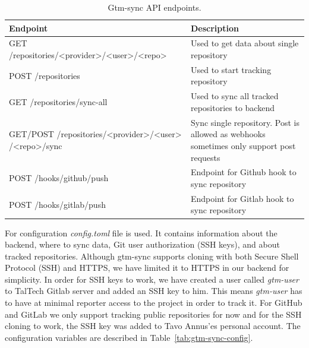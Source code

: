 \begin{table}[H]
    \centering
    \begin{tabular}{ | p{8cm} | p{6cm} |}
        \hline
        \textbf{Endpoint} & \textbf{Description}\\
        \hline
        GET /repositories/<provider>/<user>/<repo> & Used to get data about single repository \\
        \hline
        POST /repositories & Used to start tracking repository\\
        \hline
        GET /repositories/sync-all & Used to sync all tracked repositories to backend\\
        \hline
        GET/POST /repositories/<provider>/<user>
        /<repo>/sync & Sync single repository.
        Post is allowed as webhooks sometimes only support post requests\\
        \hline
        POST /hooks/github/push & Endpoint for Github hook to sync repository\\
        \hline
        POST /hooks/gitlab/push & Endpoint for Gitlab hook to sync repository\\
        \hline
    \end{tabular}
    \caption{Gtm-sync API endpoints.}
    \label{tab:gtm-sync-endpoints}
\end{table}

For configuration \textit{config.toml} file is used.
It contains information about the backend, where to sync data, Git user authorization (SSH keys), and about tracked repositories.
Although gtm-sync supports cloning with both Secure Shell Protocol (SSH) and HTTPS, we have limited it to HTTPS in our backend for simplicity.
In order for SSH keys to work, we have created a user called \textit{gtm-user} to TalTech Gitlab server and added an SSH key to him.
This means \textit{gtm-user} has to have at minimal reporter access to the project in order to track it.
For GitHub and GitLab we only support tracking public repositories for now and for the SSH cloning to work, the SSH key was added to
Tavo Annus'es personal account.
The configuration variables are described in Table~\ref{tab:gtm-sync-config}.

